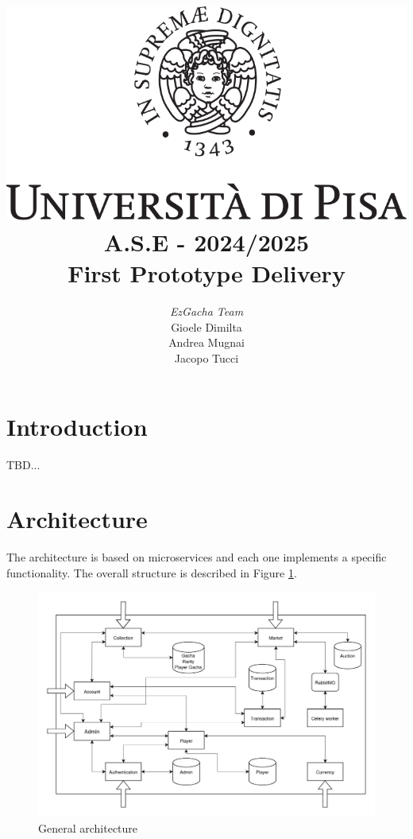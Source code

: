 \documentclass{article}
\begin{document}
\title{\includegraphics[scale=.2]{logo.png} \\[3ex] A.S.E - 2024/2025 \\ First Prototype Delivery}
\author{{\large \emph{EzGacha Team}} \\[1ex] Gioele Dimilta \\ Andrea Mugnai \\ Jacopo Tucci}
\date{}

\maketitle

\newpage
{}
\tableofcontents

\newpage
\section{Introduction}
TBD...

\section{Architecture}
The architecture is based on microservices and each one implements a specific functionality. The overall structure is described in Figure \ref{fig:general_architecture}.
\begin{figure}[ht]
    \centering
    \includegraphics[width=12cm]{architecture-v2.drawio.png}
    \caption{General architecture}
    \label{fig:general_architecture}
\end{figure}
\end{document}
